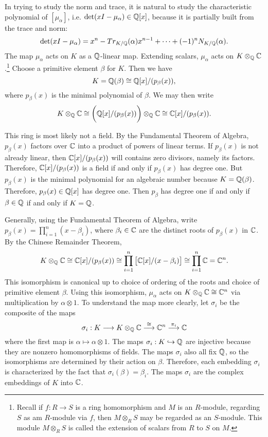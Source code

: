 In trying to study the norm and trace, it is natural to study the characteristic polynomial of $[\mu_\alpha]$, i.e. $\det(xI-\mu_\alpha) \in \mathbb{Q}[x]$, because it is partially built from the trace and norm:
	\[
	\det(xI - \mu_\alpha)= x^n - Tr_{K/\mathbb{Q}}(\alpha) x^{n-1} + \cdots + (-1)^n N_{K/\mathbb{Q}}(\alpha).
	\]
The map $\mu_\alpha$ acts on $K$ as a $\mathbb{Q}$-linear map. Extending scalars, $\mu_\alpha$ acts on $K \otimes_{\mathbb{Q}} \mathbb{C}$.\footnote{Recall if $f: R \to S$ is a ring homomorphism and $M$ is an $R$-module, regarding $S$ as am $R$-module via $f$, then $M \otimes_R S$ may be regarded as an $S$-module. This module $M \otimes_R S$ is called the extension of scalars from $R$ to $S$ on $M$.} Choose a primitive element $\beta$ for $K$. Then we have
	\[
	K= \mathbb{Q}(\beta) \cong \mathbb{Q}[x]/ (p_\beta(x)),
	\]
where $p_\beta(x)$ is the minimal polynomial of $\beta$. We may then write
	\[
	K \otimes_{\mathbb{Q}} \mathbb{C} \cong \bigg( \mathbb{Q}[x]/ (p_\beta(x)) \bigg) \otimes_{\mathbb{Q}} \mathbb{C} \cong \mathbb{C}[x] / (p_\beta(x)).
	\]


This ring is most likely not a field. By the Fundamental Theorem of Algebra, $p_\beta(x)$ factors over $\mathbb{C}$ into a product of powers of linear terms. If $p_\beta(x)$ is not already linear, then $\mathbb{C}[x] / (p_\beta(x))$ will contains zero divisors, namely its factors. Therefore, $\mathbb{C}[x] / (p_\beta(x))$ is a field if and only if $p_\beta(x)$ has degree one. But $p_\beta(x)$ is the minimal polynomial for an algebraic number because $K= \mathbb{Q}(\beta)$. Therefore, $p_\beta(x) \in \mathbb{Q}[x]$ has degree one. Then $p_\beta$ has degree one if and only if $\beta \in \mathbb{Q}$ if and only if $K= \mathbb{Q}$. 


Generally, using the Fundamental Theorem of Algebra, write $p_\beta(x)= \prod_{i=1}^n (x - \beta_i)$, where $\beta_i \in \mathbb{C}$ are the distinct roots of $p_\beta(x)$ in $\mathbb{C}$. By the Chinese Remainder Theorem,
	\[
	K \otimes_{\mathbb{Q}} \mathbb{C} \cong \mathbb{C}[x]/(p_\beta(x)) \cong \prod_{i=1}^n \big[ \mathbb{C}[x]/(x-\beta_i) \big] \cong \prod_{i=1}^n \mathbb{C} = \mathbb{C}^n.
	\]
This isomorphism is canonical up to choice of ordering of the roots and choice of primitive element $\beta$. Using this isomorphism, $\mu_\alpha$ acts on $K \otimes_{\mathbb{Q}} \mathbb{C} \cong \mathbb{C}^n$ via multiplication by $\alpha \otimes 1$. To understand the map more clearly, let $\sigma_i$ be the composite of the maps
	\[
	\sigma_i: K \stackrel{}{\longrightarrow} K \otimes_{\mathbb{Q}} \mathbb{C} \stackrel{\cong}{\longrightarrow} \mathbb{C}^n \stackrel{\pi_i}{\longrightarrow} \mathbb{C}
	\]
where the first map is $\alpha \mapsto \alpha \otimes 1$. The maps $\sigma_i: K \hookrightarrow \mathbb{Q}$ are injective because they are nonzero homomorphisms of fields. The maps $\sigma_i$ also all fix $\mathbb{Q}$, so the isomorphisms are determined by their action on $\beta$. Therefore, each embedding $\sigma_i$ is characterized by the fact that $\sigma_i(\beta)= \beta_i$. The maps $\sigma_i$ are the complex embeddings of $K$ into $\mathbb{C}$.


